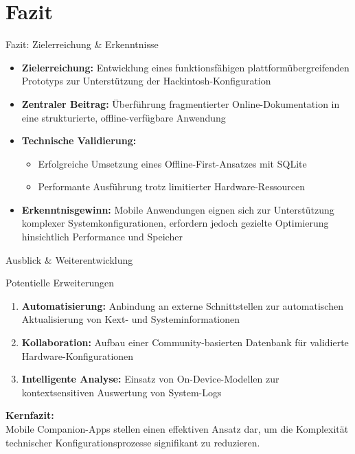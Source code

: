 \documentclass[10pt]{beamer}
\begin{document}
\section{Fazit}

\begin{frame}{Fazit: Zielerreichung \& Erkenntnisse}
    \begin{itemize}
        \item \textbf{Zielerreichung:}
        Entwicklung eines funktionsfähigen plattformübergreifenden Prototyps zur Unterstützung der Hackintosh-Konfiguration
        
        \item \textbf{Zentraler Beitrag:}
        Überführung fragmentierter Online-Dokumentation in eine strukturierte, offline-verfügbare Anwendung
        
        \item \textbf{Technische Validierung:}
        \begin{itemize}
            \item Erfolgreiche Umsetzung eines Offline-First-Ansatzes mit SQLite
            \item Performante Ausführung trotz limitierter Hardware-Ressourcen
        \end{itemize}
        
        \item \textbf{Erkenntnisgewinn:}
        Mobile Anwendungen eignen sich zur Unterstützung komplexer Systemkonfigurationen,
        erfordern jedoch gezielte Optimierung hinsichtlich Performance und Speicher
    \end{itemize}
\end{frame}


\begin{frame}{Ausblick \& Weiterentwicklung}
    \begin{block}{Potentielle Erweiterungen}
        \begin{enumerate}
            \item \textbf{Automatisierung:}
            Anbindung an externe Schnittstellen zur automatischen Aktualisierung von Kext- und Systeminformationen
            
            \item \textbf{Kollaboration:}
            Aufbau einer Community-basierten Datenbank für validierte Hardware-Konfigurationen
            
            \item \textbf{Intelligente Analyse:}
            Einsatz von On-Device-Modellen zur kontextsensitiven Auswertung von System-Logs
        \end{enumerate}
    \end{block}
    
    \vspace{0.4cm}
    
    \centering
    \textbf{Kernfazit:}\\
    Mobile Companion-Apps stellen einen effektiven Ansatz dar, um die Komplexität technischer Konfigurationsprozesse signifikant zu reduzieren.
\end{frame}
\end{document}
